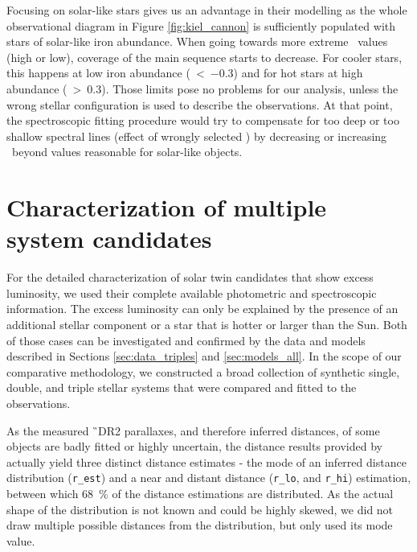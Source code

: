 Focusing on solar-like stars gives us an advantage in their modelling as the whole observational diagram in Figure \ref{fig:kiel_cannon} is sufficiently populated with stars of solar-like iron abundance. When going towards more extreme \Feh\ values (high or low), coverage of the main sequence starts to decrease. For cooler stars, this happens at low iron abundance (\Feh~\textless~$-0.3$) and for hot stars at high abundance (\Feh~\textgreater~$0.3$). Those limits pose no problems for our analysis, unless the wrong stellar configuration is used to describe the observations. At that point, the spectroscopic fitting procedure would try to compensate for too deep or too shallow spectral lines (effect of wrongly selected \Teff) by decreasing or increasing \Feh\ beyond values reasonable for solar-like objects. 

\section{Characterization of multiple system candidates}
\label{sec:multi_fit}
For the detailed characterization of solar twin candidates that show excess luminosity, we used their complete available photometric and spectroscopic information. The excess luminosity can only be explained by the presence of an additional stellar component or a star that is hotter or larger than the Sun. Both of those cases can be investigated and confirmed by the data and models described in Sections \ref{sec:data_triples} and \ref{sec:models_all}. In the scope of our comparative methodology, we constructed a broad collection of synthetic single, double, and triple stellar systems that were compared and fitted to the observations.

As the measured \G\ DR2 parallaxes, and therefore inferred distances, of some objects are badly fitted or highly uncertain, the distance results provided by \citep{2018AJ....156...58B} actually yield three distinct distance estimates - the mode of an inferred distance distribution (\texttt{r\_est}) and a near and distant distance (\texttt{r\_lo}, and \texttt{r\_hi}) estimation, between which 68~\% of the distance estimations are distributed. As the actual shape of the distribution is not known and could be highly skewed, we did not draw multiple possible distances from the distribution, but only used its mode value.

